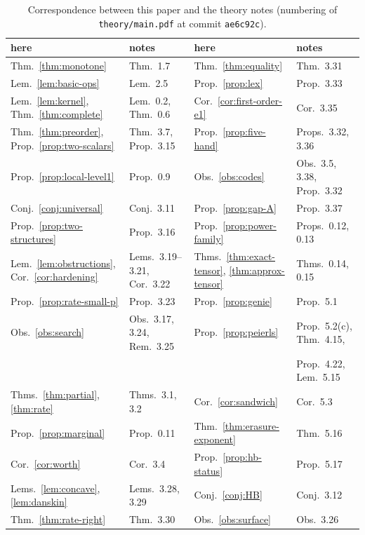 \documentclass[11pt,a4paper]{article}
\theoremstyle{plain}
\theoremstyle{definition}
\theoremstyle{remark}
\begin{document}
\begin{table}[h]
\centering
\footnotesize
\begin{tabular}{ll@{\quad}ll}
\toprule
here & notes & here & notes\\
\midrule
Thm.~\ref{thm:monotone} & Thm.~1.7 & Thm.~\ref{thm:equality} & Thm.~3.31\\
Lem.~\ref{lem:basic-ops} & Lem.~2.5 & Prop.~\ref{prop:lex} & Prop.~3.33\\
Lem.~\ref{lem:kernel}, Thm.~\ref{thm:complete} & Lem.~0.2, Thm.~0.6 & Cor.~\ref{cor:first-order-e1} & Cor.~3.35\\
Thm.~\ref{thm:preorder}, Prop.~\ref{prop:two-scalars} & Thm.~3.7, Prop.~3.15 & Prop.~\ref{prop:five-hand} & Props.~3.32, 3.36\\
Prop.~\ref{prop:local-level1} & Prop.~0.9 & Obs.~\ref{obs:codes} & Obs.~3.5, 3.38, Prop.~3.32\\
Conj.~\ref{conj:universal} & Conj.~3.11 & Prop.~\ref{prop:gap-A} & Prop.~3.37\\
Prop.~\ref{prop:two-structures} & Prop.~3.16 & Prop.~\ref{prop:power-family} & Props.~0.12, 0.13\\
Lem.~\ref{lem:obstructions}, Cor.~\ref{cor:hardening} & Lems.~3.19--3.21, Cor.~3.22 & Thms.~\ref{thm:exact-tensor}, \ref{thm:approx-tensor} & Thms.~0.14, 0.15\\
Prop.~\ref{prop:rate-small-p} & Prop.~3.23 & Prop.~\ref{prop:genie} & Prop.~5.1\\
Obs.~\ref{obs:search} & Obs.~3.17, 3.24, Rem.~3.25 & Prop.~\ref{prop:peierls} & Prop.~5.2(c), Thm.~4.15,\\ & & & Prop.~4.22, Lem.~5.15\\
Thms.~\ref{thm:partial}, \ref{thm:rate} & Thms.~3.1, 3.2 & Cor.~\ref{cor:sandwich} & Cor.~5.3\\
Prop.~\ref{prop:marginal} & Prop.~0.11 & Thm.~\ref{thm:erasure-exponent} & Thm.~5.16\\
Cor.~\ref{cor:worth} & Cor.~3.4 & Prop.~\ref{prop:hb-status} & Prop.~5.17\\
Lems.~\ref{lem:concave}, \ref{lem:danskin} & Lems.~3.28, 3.29 & Conj.~\ref{conj:HB} & Conj.~3.12\\
Thm.~\ref{thm:rate-right} & Thm.~3.30 & Obs.~\ref{obs:surface} & Obs.~3.26\\
\bottomrule
\end{tabular}
\caption{Correspondence between this paper and the theory notes (numbering of \texttt{theory/main.pdf} at commit \texttt{ae6c92c}).}
\label{tab:map}
\end{table}


\end{document}
